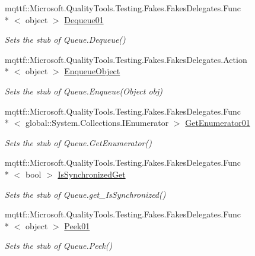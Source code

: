 \begin{DoxyCompactItemize}
mqttf\-::\-Microsoft.\-Quality\-Tools.\-Testing.\-Fakes.\-Fakes\-Delegates.\-Func\\*
$<$ object $>$ \hyperlink{class_system_1_1_collections_1_1_fakes_1_1_stub_queue_a37f0ac0c812ae36caeb4d89c5ae19e04}{Dequeue01}
\begin{DoxyCompactList}\small\item\em Sets the stub of Queue.\-Dequeue()\end{DoxyCompactList}\item 
mqttf\-::\-Microsoft.\-Quality\-Tools.\-Testing.\-Fakes.\-Fakes\-Delegates.\-Action\\*
$<$ object $>$ \hyperlink{class_system_1_1_collections_1_1_fakes_1_1_stub_queue_a25d26ae6deb94c05340cd9109516e352}{Enqueue\-Object}
\begin{DoxyCompactList}\small\item\em Sets the stub of Queue.\-Enqueue(\-Object obj)\end{DoxyCompactList}\item 
mqttf\-::\-Microsoft.\-Quality\-Tools.\-Testing.\-Fakes.\-Fakes\-Delegates.\-Func\\*
$<$ global\-::\-System.\-Collections.\-I\-Enumerator $>$ \hyperlink{class_system_1_1_collections_1_1_fakes_1_1_stub_queue_a9865651f4c18621306b476c9fe6cf8bc}{Get\-Enumerator01}
\begin{DoxyCompactList}\small\item\em Sets the stub of Queue.\-Get\-Enumerator()\end{DoxyCompactList}\item 
mqttf\-::\-Microsoft.\-Quality\-Tools.\-Testing.\-Fakes.\-Fakes\-Delegates.\-Func\\*
$<$ bool $>$ \hyperlink{class_system_1_1_collections_1_1_fakes_1_1_stub_queue_a00f603b2d312dad9235a4fe5fc4f3c73}{Is\-Synchronized\-Get}
\begin{DoxyCompactList}\small\item\em Sets the stub of Queue.\-get\-\_\-\-Is\-Synchronized()\end{DoxyCompactList}\item 
mqttf\-::\-Microsoft.\-Quality\-Tools.\-Testing.\-Fakes.\-Fakes\-Delegates.\-Func\\*
$<$ object $>$ \hyperlink{class_system_1_1_collections_1_1_fakes_1_1_stub_queue_a2abe13aa02d8bba50dcee768e96df100}{Peek01}
\begin{DoxyCompactList}\small\item\em Sets the stub of Queue.\-Peek()\end{DoxyCompactList}\item 

\end{DoxyCompactItemize}
